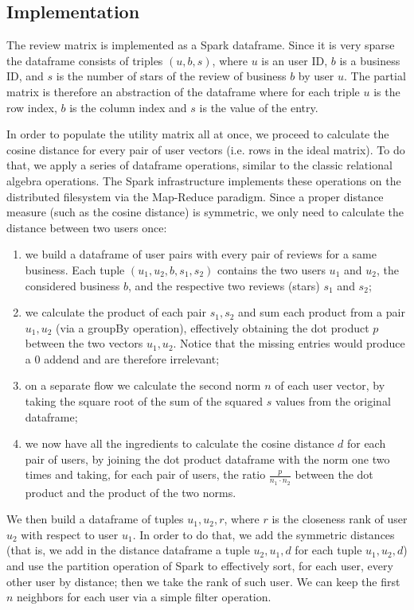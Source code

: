 \documentclass[11pt,a4paper]{article}
\begin{document}
\begin{multicols}{2}
\subsection{Implementation}
The review matrix is implemented as a Spark dataframe.
Since it is very sparse the dataframe consists of triples $(u,b,s)$, where $u$ is an user ID, $b$ is a business ID, and $s$ is the number of stars of the review of business $b$ by user $u$.
The partial matrix is therefore an abstraction of the dataframe where for each triple $u$ is the row index, $b$ is the column index and $s$ is the value of the entry.

In order to populate the utility matrix all at once, we proceed to calculate the cosine distance for every pair of user vectors (i.e. rows in the ideal matrix).
To do that, we apply a series of dataframe operations, similar to the classic relational algebra operations. The Spark infrastructure implements these operations on the distributed filesystem via the Map-Reduce paradigm.
Since a proper distance measure (such as the cosine distance) is symmetric, we only need to calculate the distance between two users once:
\begin{enumerate}
	\item we build a dataframe of user pairs with every pair of reviews for a same business. Each tuple $(u_1,u_2,b,s_1,s_2)$ contains the two users $u_1$ and $u_2$, the considered business $b$, and the respective two reviews (stars) $s_1$ and $s_2$;
	\item we calculate the product of each pair $s_1,s_2$ and sum each product from a pair $u_1,u_2$ (via a groupBy operation), effectively obtaining the dot product $p$ between the two vectors $u_1,u_2$. Notice that the missing entries would produce a $0$ addend and are therefore irrelevant;
	\item on a separate flow we calculate the second norm $n$ of each user vector, by taking the square root of the sum of the squared $s$ values from the original dataframe;
	\item we now have all the ingredients to calculate the cosine distance $d$ for each pair of users, by joining the dot product dataframe with the norm one two times and taking, for each pair of users, the ratio $\frac{p}{n_1\cdot n_2}$ between the dot product and the product of the two norms.
\end{enumerate}

We then build a dataframe of tuples $u_1,u_2,r$, where $r$ is the closeness rank of user $u_2$ with respect to user $u_1$.
In order to do that, we add the symmetric distances (that is, we add in the distance dataframe a tuple $u_2,u_1,d$ for each tuple $u_1,u_2,d$) and use the partition operation of Spark to effectively sort, for each user, every other user by distance; then we take the rank of such user.
We can keep the first $n$ neighbors for each user via a simple filter operation.


\end{multicols}
\end{document}
